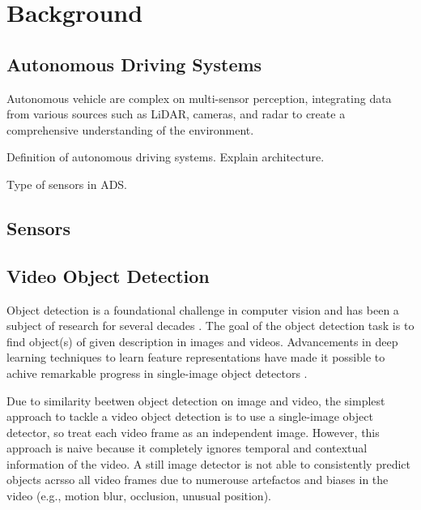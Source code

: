 \section{Background}  \label{Background}

\subsection{Autonomous Driving Systems} \label{Background:ADS}


Autonomous vehicle are complex on multi-sensor perception, integrating data from various sources such as LiDAR, cameras, and radar to create a comprehensive understanding of the environment.

Definition of autonomous driving systems. Explain architecture.

Type of sensors in ADS.

\subsection{Sensors} \label{Background:Sensors}



\subsection{Video Object Detection} \label{Background:VideoObjectDetection}


Object detection is a foundational challenge in computer vision and has been a subject of research for several decades \cite{fischlerRepresentationMatchingPictorial1973}. The goal of the object detection task is to find object(s) of given description in images and videos. Advancements in deep learning techniques to learn feature representations \cite{hintonReducingDimensionalityData2006, lecunDeepLearning2015} have made it possible to achive remarkable progress in single-image object detectors \cite{girshickRichFeatureHierarchies2014a}.


Due to similarity beetwen object detection on image and video, the simplest approach to tackle a video object detection is to use a single-image object detector, so treat each video frame as an independent image. However, this approach is naive because it completely ignores temporal and contextual information of the video. A still image detector is not able to consistently predict objects acrsso all video frames due to numerouse artefactos and biases in the video (e.g., motion blur, occlusion, unusual position).

